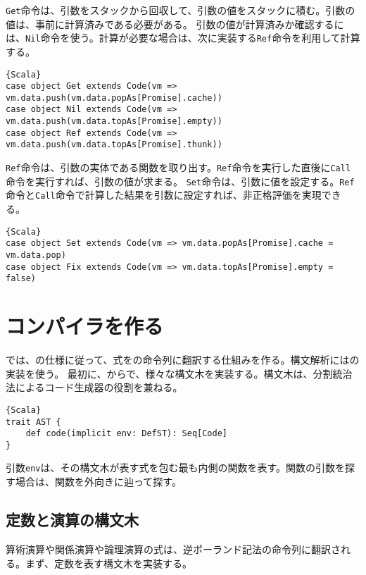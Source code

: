 \documentclass[10pt,a4paper]{book}
\begin{document}
\texttt{Get}命令は、引数をスタックから回収して、引数の値をスタックに積む。引数の値は、事前に計算済みである必要がある。
引数の値が計算済みか確認するには、\texttt{Nil}命令を使う。計算が必要な場合は、次に実装する\texttt{Ref}命令を利用して計算する。

\begin{Verbatim}{Scala}
case object Get extends Code(vm => vm.data.push(vm.data.popAs[Promise].cache))
case object Nil extends Code(vm => vm.data.push(vm.data.topAs[Promise].empty))
case object Ref extends Code(vm => vm.data.push(vm.data.topAs[Promise].thunk))
\end{Verbatim}

\texttt{Ref}命令は、引数の実体である関数を取り出す。\texttt{Ref}命令を実行した直後に\texttt{Call}命令を実行すれば、引数の値が求まる。
\texttt{Set}命令は、引数に値を設定する。\texttt{Ref}命令と\texttt{Call}命令で計算した結果を引数に設定すれば、非正格評価を実現できる。

\begin{Verbatim}{Scala}
case object Set extends Code(vm => vm.data.popAs[Promise].cache = vm.data.pop)
case object Fix extends Code(vm => vm.data.topAs[Promise].empty = false)
\end{Verbatim}

\chapter{コンパイラを作る\label{chap:favac}}

では、の仕様に従って、式をの命令列に翻訳する仕組みを作る。構文解析にはの実装を使う。
最初に、からで、様々な構文木を実装する。構文木は、分割統治法によるコード生成器の役割を兼ねる。

\begin{Verbatim}{Scala}
trait AST {
	def code(implicit env: DefST): Seq[Code]
}
\end{Verbatim}

引数\texttt{env}は、その構文木が表す式を包む最も内側の関数を表す。関数の引数を探す場合は、関数を外向きに辿って探す。

\section{定数と演算の構文木\label{sect:OpST}}

算術演算や関係演算や論理演算の式は、逆ポーランド記法の命令列に翻訳される。まず、定数を表す構文木を実装する。
\end{document}
